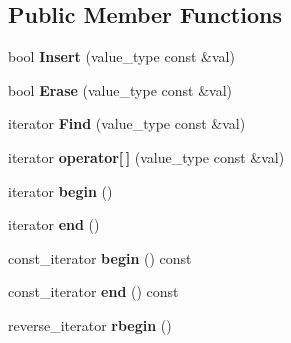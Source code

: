\subsection*{Public Member Functions}
\begin{DoxyCompactItemize}
\item 
\hypertarget{classlsf_1_1container_1_1Set_a878f4b5be86bc067c0f69424fbe68b11}{
bool {\bfseries Insert} (value\_\-type const \&val)}
\label{classlsf_1_1container_1_1Set_a878f4b5be86bc067c0f69424fbe68b11}

\item 
\hypertarget{classlsf_1_1container_1_1Set_a8cab584ff5978e5bb858ba71f6c7bec8}{
bool {\bfseries Erase} (value\_\-type const \&val)}
\label{classlsf_1_1container_1_1Set_a8cab584ff5978e5bb858ba71f6c7bec8}

\item 
\hypertarget{classlsf_1_1container_1_1Set_abd166ceffeaf13acd2f7882f4dac3641}{
iterator {\bfseries Find} (value\_\-type const \&val)}
\label{classlsf_1_1container_1_1Set_abd166ceffeaf13acd2f7882f4dac3641}

\item 
\hypertarget{classlsf_1_1container_1_1Set_aa9ea27c2d1a50b7f949e1366de9137f0}{
iterator {\bfseries operator\mbox{[}$\,$\mbox{]}} (value\_\-type const \&val)}
\label{classlsf_1_1container_1_1Set_aa9ea27c2d1a50b7f949e1366de9137f0}

\item 
\hypertarget{classlsf_1_1container_1_1Set_a31fa679d1a1449d607ce37fa9993a540}{
iterator {\bfseries begin} ()}
\label{classlsf_1_1container_1_1Set_a31fa679d1a1449d607ce37fa9993a540}

\item 
\hypertarget{classlsf_1_1container_1_1Set_a9f51c07fe58a09ed43d386e903842bb4}{
iterator {\bfseries end} ()}
\label{classlsf_1_1container_1_1Set_a9f51c07fe58a09ed43d386e903842bb4}

\item 
\hypertarget{classlsf_1_1container_1_1Set_ade81728a003d0445cb36a0aa3b54fa05}{
const\_\-iterator {\bfseries begin} () const }
\label{classlsf_1_1container_1_1Set_ade81728a003d0445cb36a0aa3b54fa05}

\item 
\hypertarget{classlsf_1_1container_1_1Set_a2edb1bee70013662045a459117bc8712}{
const\_\-iterator {\bfseries end} () const }
\label{classlsf_1_1container_1_1Set_a2edb1bee70013662045a459117bc8712}

\item 
\hypertarget{classlsf_1_1container_1_1Set_ac79d1cffa21529f47e2c192b4cd47218}{
reverse\_\-iterator {\bfseries rbegin} ()}
\label{classlsf_1_1container_1_1Set_ac79d1cffa21529f47e2c192b4cd47218}


\end{DoxyCompactItemize}
